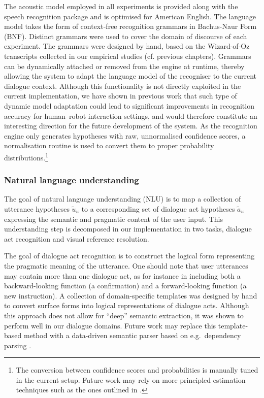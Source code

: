 The acoustic model employed in all experiments is provided along with the speech recognition package and is optimised for American English. The language model takes the form of context-free recognition grammars in Bachus-Naur Form (BNF). Distinct grammars were used to cover the domain of discourse of each experiment. The grammars were designed by hand, based on the Wizard-of-Oz transcripts collected in our empirical studies (cf. previous chapters). Grammars can be dynamically attached or removed from the engine at runtime, thereby allowing the system to adapt the language model of the recogniser to the current dialogue context. Although this functionality is not directly exploited in the current implementation, we have shown in previous work \citep[see][]{ESSLLI2008-springerreprint} that such type of dynamic model adaptation could lead to significant improvements in recognition accuracy for human--robot interaction settings, and would therefore constitute an interesting direction for the future development of the system.  As the recognition engine only generates hypotheses with raw, unnormalised confidence scores, a normalisation routine is used to convert them to proper probability distributions.\footnote{The conversion between confidence scores and probabilities is manually tuned in the current setup.  Future work may rely on more principled estimation techniques such as the ones outlined in \cite{Williams08}.}


\subsubsection*{Natural language understanding}

The goal of natural language understanding (NLU) is to map a collection of utterance hypotheses $\tilde{u}_u$ to a corresponding set of dialogue act hypotheses $\tilde{a}_u$ expressing the semantic and pragmatic content of the user input. This understanding step is decomposed in our implementation in two tasks, dialogue act recognition and visual reference resolution.  

The goal of dialogue act recognition is to construct the logical form representing the pragmatic meaning of the utterance. One should note that user utterances may contain more than one dialogue act, as for instance in  including both a backward-looking function (a confirmation) and a forward-looking function (a new instruction).  A collection of domain-specific templates was designed by hand to convert surface forms into logical representations of dialogue acts.  Although this approach does not allow for ``deep'' semantic extraction, it was shown to perform well in our dialogue domains. Future work may replace this template-based method with a data-driven semantic parser based on e.g.\  dependency parsing \citep{Nivre:Etal07}. 

